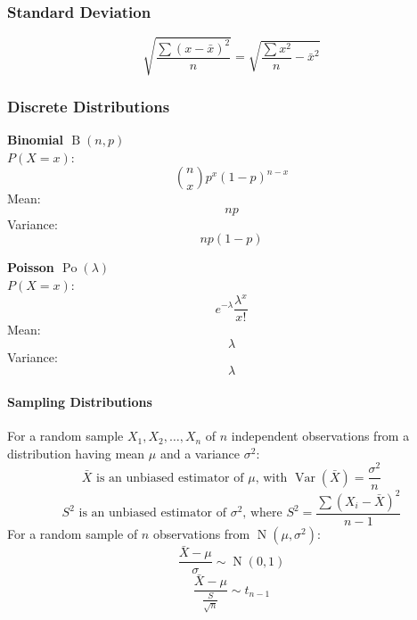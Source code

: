 \documentclass{book}
\DeclareMathOperator{\Var}{Var}
\DeclareMathOperator{\poisson}{Po}
\DeclareMathOperator{\normal}{N}
\DeclareMathOperator{\binomial}{B}
\begin{document}
        \subsubsection{Standard Deviation}
        \begin{equation}
            \sqrt{\frac{\sum(x-\bar{x})^2}{n}}=\sqrt{\frac{\sum x^2}{n}-\bar{x}^2}
        \end{equation}

        \subsubsection{Discrete Distributions}
        \noindent\textbf{Binomial $\binomial(n,p)$} \\
        $P(X=x)$:
        \begin{equation}
            \binom{n}{x}p^x(1-p)^{n-x}
        \end{equation}
        Mean:
        \begin{equation}
            np
        \end{equation}
        Variance:
        \begin{equation}
            np(1-p)
        \end{equation}

        \noindent\textbf{Poisson $\poisson(\lambda)$} \\
        $P(X=x):$
        \begin{equation}
            e^{-\lambda}\frac{\lambda^x}{x!}
        \end{equation}
        Mean:
        \begin{equation}
            \lambda
        \end{equation}
        Variance:
        \begin{equation}
            \lambda
        \end{equation}
        
        \paragraph{Sampling Distributions}
        For a random sample $X_1,X_2,\dots,X_n$ of $n$ independent observations from a distribution having mean $\mu$ and a variance $\sigma^2$:
        \begin{equation}
            \bar{X}\text{ is an unbiased estimator of }\mu\text{, with }\Var(\bar{X})=\frac{\sigma^2}{n}
        \end{equation}
        \begin{equation}
            S^2\text{ is an unbiased estimator of }\sigma^2\text{, where }S^2=\frac{\sum(X_i-\bar{X})^2}{n-1}
        \end{equation}
        For a random sample of $n$ observations from $\normal(\mu,\sigma^2)$:
        \begin{equation}
            \frac{\bar{X}-\mu}{\sigma}\sim\normal(0,1)
        \end{equation}
        \begin{equation}
            \frac{\bar{X}-\mu}{\frac{S}{\sqrt{n}}}\sim t_{n-1}
        \end{equation}
\end{document}
